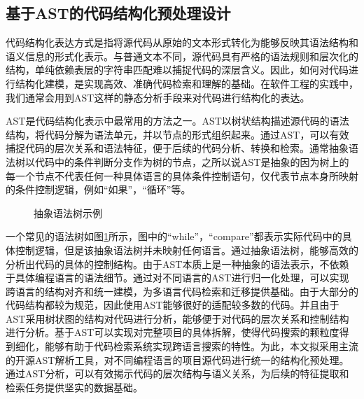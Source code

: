 \documentclass[UTF8,a4paper,12pt]{ctexart}
\numberwithin{equation}{section}
\begin{document}
\subsection{基于AST的代码结构化预处理设计}
代码结构化表达方式是指将源代码从原始的文本形式转化为能够反映其语法结构和语义信息的形式化表示。与普通文本不同，源代码具有严格的语法规则和层次化的结构，单纯依赖表层的字符串匹配难以捕捉代码的深层含义。因此，如何对代码进行结构化建模，是实现高效、准确代码检索和理解的基础。在软件工程的实践中，我们通常会用到AST这样的静态分析手段来对代码进行结构化的表达。\par
AST是代码结构化表示中最常用的方法之一。AST以树状结构描述源代码的语法结构，将代码分解为语法单元，并以节点的形式组织起来。通过AST，可以有效捕捉代码的层次关系和语法特征，便于后续的代码分析、转换和检索。通常抽象语法树以代码中的条件判断分支作为树的节点，之所以说AST是抽象的因为树上的每一个节点不代表任何一种具体语言的具体条件控制语句，仅代表节点本身所映射的条件控制逻辑，例如“如果”，“循环”等。\par
\begin{figure}[H]
	\caption{抽象语法树示例}
	\label{ast}
\end{figure}
一个常见的语法树如图\ref{ast}所示，图中的“while”，“compare”都表示实际代码中的具体控制逻辑，但是该抽象语法树并未映射任何语言。通过抽象语法树，能够高效的分析出代码的具体的控制结构。由于AST本质上是一种抽象的语法表示，不依赖于具体编程语言的语法细节。通过对不同语言的AST进行归一化处理，可以实现跨语言的结构对齐和统一建模，为多语言代码检索和迁移提供基础。由于大部分的代码结构都较为规范，因此使用AST能够很好的适配较多数的代码。并且由于AST采用树状图的结构对代码进行分析，能够便于对代码的层次关系和控制结构进行分析。基于AST可以实现对完整项目的具体拆解，使得代码搜索的颗粒度得到细化，能够有助于代码检索系统实现跨语言搜索的特性。为此，本文拟采用主流的开源AST解析工具，对不同编程语言的项目源代码进行统一的结构化预处理。通过AST分析，可以有效揭示代码的层次结构与语义关系，为后续的特征提取和检索任务提供坚实的数据基础。\par
\end{document}
